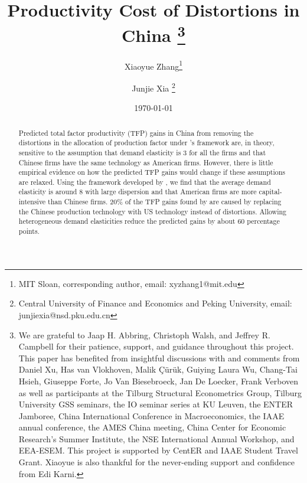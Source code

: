 \documentclass[12pt]{article}
\begin{document}
\begin{titlepage}
\title{Productivity Cost of Distortions in China
\thanks{We are grateful to Jaap H. Abbring, Christoph Walsh, and Jeffrey R. Campbell for their patience, support, and guidance throughout this project. This paper has benefited from insightful discussions with and comments from Daniel Xu, Has van Vlokhoven, Malik \c{C}\"ur\"uk, 
Guiying Laura Wu, Chang-Tai Hsieh, Giuseppe Forte, Jo Van Biesebroeck, Jan De Loecker, Frank Verboven as well as participants at the Tilburg Structural Econometrics Group, Tilburg University GSS seminars, the IO seminar series at KU Leuven, the ENTER Jamboree, China International Conference in Macroeconomics, the IAAE annual conference, the AMES China meeting, China Center for Economic Research's Summer Institute, the NSE International Annual Workshop, and EEA-ESEM. This project is supported by CentER and IAAE Student Travel Grant. Xiaoyue is also thankful for the never-ending support and confidence from Edi Karni.}} %
\author{Xiaoyue Zhang\thanks{MIT Sloan, corresponding author, email: xyzhang1@mit.edu} \and Junjie Xia \thanks{Central University of Finance and Economics and Peking University, email: junjiexia@nsd.pku.edu.cn}}
\date{\today}
\maketitle
%

\begin{abstract}
\frenchspacing
\noindent Predicted total factor productivity (TFP) gains in China from removing the distortions in the allocation of production factor under \citet{hsiehMisallocationManufacturingTFP2009}'s framework are, in theory, sensitive to the assumption that demand elasticity is 3 for all the firms and that Chinese firms have the same technology as American firms. However, there is little empirical evidence on how the predicted TFP gains would change if these assumptions are relaxed. Using the framework developed by \citet{zhangFactorShares}, we find that the average demand elasticity is around 8 with large dispersion and that American firms are more capital-intensive than Chinese firms. 20\% of the TFP gains found by \citet{hsiehMisallocationManufacturingTFP2009} are caused by replacing the Chinese production technology with US technology instead of distortions. Allowing heterogeneous demand elasticities reduce the predicted gains by about 60 percentage points.


\end{abstract}
\end{titlepage}
\end{document}
